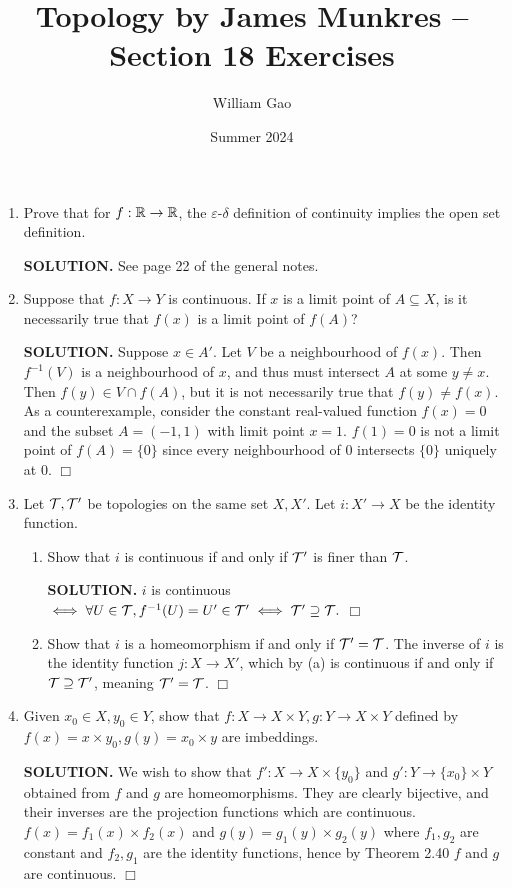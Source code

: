 \documentclass{article}
\title{Topology by James Munkres -- Section 18 Exercises}
\author{William Gao}
\date{Summer 2024}
\begin{document}
\maketitle
\begin{enumerate}
    \item Prove that for $f: \mathbb{R} \rightarrow \mathbb{R}$, the $\varepsilon$-$\delta$ definition of continuity implies the open set definition.

    {\bf SOLUTION.} See page 22 of the general notes.

    \item Suppose that $f: X \rightarrow Y$ is continuous. If $x$ is a limit point of $A \subseteq X$, is it necessarily true that $f(x)$ is a limit point of $f(A)$?

    {\bf SOLUTION.} Suppose $x \in A'$. Let $V$ be a neighbourhood of $f(x)$. Then $f^{-1}(V)$ is a neighbourhood of $x$, and thus must intersect $A$ at some $y \neq x$. Then $f(y) \in V \cap f(A)$, but it is not necessarily true that $f(y) \neq f(x)$. As a counterexample, consider the constant real-valued function $f(x) = 0$ and the subset $A = (-1, 1)$ with limit point $x = 1$. $f(1) = 0$ is not a limit point of $f(A) = \{0\}$ since every neighbourhood of $0$ intersects $\{0\}$ uniquely at $0$. $\Box$

    \item Let $\mathcal{T}, \mathcal{T}'$ be topologies on the same set $X, X'$. Let $i: X' \rightarrow X$ be the identity function.
    \begin{enumerate}
        \item Show that $i$ is continuous if and only if $\mathcal{T}'$ is finer than $\mathcal{T}$.

        {\bf SOLUTION.} $i$ is continuous $\iff \forall U \in \mathcal{T}, f^{-1}(U) = U' \in \mathcal{T}' \iff \mathcal{T}' \supseteq \mathcal{T}.$ $\Box$

        \item Show that $i$ is a homeomorphism if and only if $\mathcal{T}' = \mathcal{T}$. The inverse of $i$ is the identity function $j: X \rightarrow X'$, which by (a) is continuous if and only if $\mathcal{T} \supseteq \mathcal{T}'$, meaning $\mathcal{T}' = \mathcal{T}$. $\Box$
    \end{enumerate}

    \item Given $x_0 \in X, y_0 \in Y$, show that $f: X \rightarrow X \times Y, g: Y \rightarrow X \times Y$ defined by $f(x) = x \times y_0, g(y) = x_0 \times y$ are imbeddings. 
    
    {\bf SOLUTION.} We wish to show that $f': X \rightarrow X \times \{y_0\}$ and $g': Y \rightarrow \{x_0\} \times Y$ obtained from $f$ and $g$ are homeomorphisms. They are clearly bijective, and their inverses are the projection functions which are continuous. $f(x) = f_1(x) \times f_2(x)$ and $g(y) = g_1(y) \times g_2(y)$ where $f_1, g_2$ are constant and $f_2, g_1$ are the identity functions, hence by Theorem 2.40 $f$ and $g$ are continuous. $\Box$


\end{enumerate}
\end{document}
